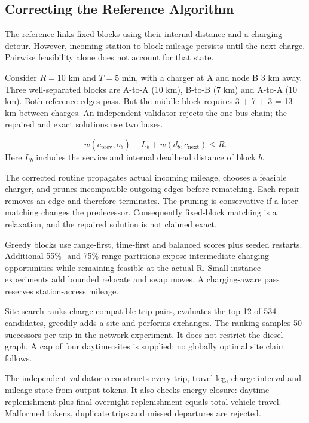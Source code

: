 
\subsection{Correcting the Reference Algorithm}

The reference links fixed blocks using their internal distance and a charging detour. However, incoming station-to-block mileage persists until the next charge. Pairwise feasibility alone does not account for that state.


Consider $R=10$ km and $T=5$ min, with a charger at A and node B 3 km away. Three well-separated blocks are A-to-A (10 km), B-to-B (7 km) and A-to-A (10 km). Both reference edges pass. But the middle block requires 3 + 7 + 3 = 13 km between charges. An independent validator rejects the one-bus chain; the repaired and exact solutions use two buses.


\begin{equation}
w(c_{\mathrm{prev}},o_b)+L_b+w(d_b,c_{\mathrm{next}})\le R.
\end{equation}
Here $L_b$ includes the service and internal deadhead distance of block $b$.

The corrected routine propagates actual incoming mileage, chooses a feasible charger, and prunes incompatible outgoing edges before rematching. Each repair removes an edge and therefore terminates. The pruning is conservative if a later matching changes the predecessor. Consequently fixed-block matching is a relaxation, and the repaired solution is not claimed exact.


Greedy blocks use range-first, time-first and balanced scores plus seeded restarts. Additional 55\%- and 75\%-range partitions expose intermediate charging opportunities while remaining feasible at the actual R. Small-instance experiments add bounded relocate and swap moves. A charging-aware pass reserves station-access mileage.


Site search ranks charge-compatible trip pairs, evaluates the top 12 of 534 candidates, greedily adds a site and performs exchanges. The ranking samples 50 successors per trip in the network experiment. It does not restrict the diesel graph. A cap of four daytime sites is supplied; no globally optimal site claim follows.


The independent validator reconstructs every trip, travel leg, charge interval and mileage state from output tokens. It also checks energy closure: daytime replenishment plus final overnight replenishment equals total vehicle travel. Malformed tokens, duplicate trips and missed departures are rejected.

